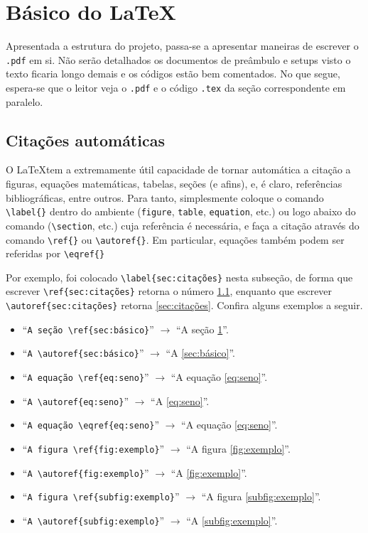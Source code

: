 \section{Básico do \LaTeX}
\label{sec:básico}
    Apresentada a estrutura do projeto, passa-se a apresentar maneiras de escrever o {\tt.pdf} em si.
    Não serão detalhados os documentos de preâmbulo e setups visto o texto ficaria longo demais e os códigos estão bem comentados.
    No que segue, espera-se que o leitor veja o {\tt.pdf} e o código {\tt.tex} da seção correspondente em paralelo.

    \subsection{Citações automáticas}
    \label{sec:citações}
        O \LaTeX tem a extremamente útil capacidade de tornar automática a citação a figuras, equações matemáticas, tabelas, seções (e afins), e, é claro, referências bibliográficas, entre outros.
        Para tanto, simplesmente coloque o comando \verb|\label{}| dentro do ambiente ({\tt figure}, {\tt table}, {\tt equation}, etc.) ou logo abaixo do comando (\verb|\section|, etc.) cuja referência é necessária, e faça a citação através do comando \verb|\ref{}| ou \verb|\autoref{}|.
        Em particular, equações também podem ser referidas por \verb|\eqref{}|

        Por exemplo, foi colocado \verb|\label{sec:citações}| nesta subseção, 
        de forma que escrever \verb|\ref{sec:citações}| retorna o número \ref{sec:citações},
        enquanto que escrever \verb|\autoref{sec:citações}| retorna \autoref{sec:citações}.
        Confira alguns exemplos a seguir.
        \begin{itemize}
            \item ``\verb|A seção \ref{sec:básico}|'' $\to$ ``A seção \ref{sec:básico}''.
            \item ``\verb|A \autoref{sec:básico}|'' $\to$ ``A \autoref{sec:básico}''.
            \item ``\verb|A equação \ref{eq:seno}|'' $\to$ ``A equação \ref{eq:seno}''.
            \item ``\verb|A \autoref{eq:seno}|'' $\to$ ``A \autoref{eq:seno}''.
            \item ``\verb|A equação \eqref{eq:seno}|'' $\to$ ``A equação \eqref{eq:seno}''.
            \item ``\verb|A figura \ref{fig:exemplo}|'' $\to$ ``A figura \ref{fig:exemplo}''.
            \item ``\verb|A \autoref{fig:exemplo}|'' $\to$ ``A \autoref{fig:exemplo}''.
            \item ``\verb|A figura \ref{subfig:exemplo}|'' $\to$ ``A figura \ref{subfig:exemplo}''.
            \item ``\verb|A \autoref{subfig:exemplo}|'' $\to$ ``A \autoref{subfig:exemplo}''.
        \end{itemize}

